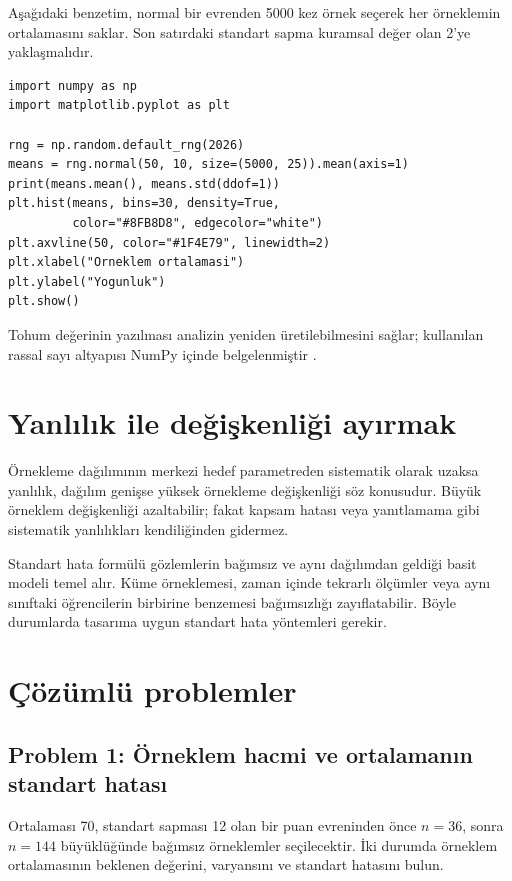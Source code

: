 \begin{softwarebox}
Aşağıdaki benzetim, normal bir evrenden 5000 kez örnek seçerek her örneklemin
ortalamasını saklar. Son satırdaki standart sapma kuramsal değer olan 2'ye
yaklaşmalıdır.
\begin{lstlisting}
import numpy as np
import matplotlib.pyplot as plt

rng = np.random.default_rng(2026)
means = rng.normal(50, 10, size=(5000, 25)).mean(axis=1)
print(means.mean(), means.std(ddof=1))
plt.hist(means, bins=30, density=True,
         color="#8FB8D8", edgecolor="white")
plt.axvline(50, color="#1F4E79", linewidth=2)
plt.xlabel("Orneklem ortalamasi")
plt.ylabel("Yogunluk")
plt.show()
\end{lstlisting}
Tohum değerinin yazılması analizin yeniden üretilebilmesini sağlar; kullanılan
rassal sayı altyapısı NumPy içinde belgelenmiştir \citep{harris2020}.
\end{softwarebox}

\section{Yanlılık ile değişkenliği ayırmak}
\label{sec:sampling-bias-variance}

Örnekleme dağılımının merkezi hedef parametreden sistematik olarak uzaksa
yanlılık, dağılım genişse yüksek örnekleme değişkenliği söz konusudur. Büyük
örneklem değişkenliği azaltabilir; fakat kapsam hatası veya yanıtlamama gibi
sistematik yanlılıkları kendiliğinden gidermez.

\begin{assumptionbox}
Standart hata formülü gözlemlerin bağımsız ve aynı dağılımdan geldiği basit
modeli temel alır. Küme örneklemesi, zaman içinde tekrarlı ölçümler veya aynı
sınıftaki öğrencilerin birbirine benzemesi bağımsızlığı zayıflatabilir. Böyle
durumlarda tasarıma uygun standart hata yöntemleri gerekir.
\end{assumptionbox}

\section{Çözümlü problemler}

\subsection*{Problem 1: Örneklem hacmi ve ortalamanın standart hatası}

Ortalaması 70, standart sapması 12 olan bir puan evreninden önce $n=36$,
sonra $n=144$ büyüklüğünde bağımsız örneklemler seçilecektir. İki durumda
örneklem ortalamasının beklenen değerini, varyansını ve standart hatasını
bulun.


